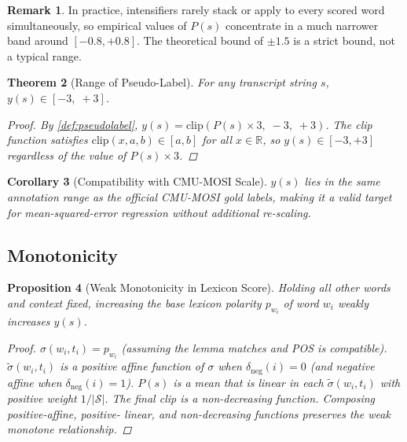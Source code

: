 \documentclass[12pt,a4paper]{article}
\theoremstyle{plain}
\newtheorem{theorem}{Theorem}[section]
\newtheorem{proposition}[theorem]{Proposition}
\newtheorem{corollary}[theorem]{Corollary}
\theoremstyle{definition}
\newtheorem{remark}[theorem]{Remark}
\begin{document}
\begin{remark}
  In practice, intensifiers rarely stack or apply to every scored
  word simultaneously, so empirical values of $P(s)$ concentrate
  in a much narrower band around $[-0.8, +0.8]$.  The theoretical
  bound of $\pm 1.5$ is a strict bound, not a typical range.
\end{remark}

\begin{theorem}[Range of Pseudo-Label]
\label{thm:label_range}
  For any transcript string $s$, $y(s) \in [-3,\; +3]$.
  \begin{proof}
    By \cref{def:pseudolabel},
    $y(s) = \text{clip}(P(s) \times 3,\; -3,\; +3)$.
    The clip function satisfies $\text{clip}(x, a, b) \in [a, b]$
    for all $x \in \mathbb{R}$, so $y(s) \in [-3, +3]$ regardless
    of the value of $P(s) \times 3$.
  \end{proof}
\end{theorem}

\begin{corollary}[Compatibility with CMU-MOSI Scale]
\label{cor:compat}
  $y(s)$ lies in the same annotation range as the official CMU-MOSI
  gold labels, making it a valid target for mean-squared-error
  regression without additional re-scaling.
\end{corollary}

\subsection{Monotonicity}

\begin{proposition}[Weak Monotonicity in Lexicon Score]
\label{prop:monotone}
  Holding all other words and context fixed, increasing the base
  lexicon polarity $p_{w_i}$ of word $w_i$ weakly increases $y(s)$.
  \begin{proof}
    $\sigma(w_i, t_i) = p_{w_i}$ (assuming the lemma matches and
    POS is compatible).  $\tilde{\sigma}(w_i,t_i)$ is a positive
    affine function of $\sigma$ when $\delta_{\text{neg}}(i) = 0$
    (and negative affine when $\delta_{\text{neg}}(i) = 1$).
    $P(s)$ is a mean that is linear in each $\tilde{\sigma}(w_i,t_i)$
    with positive weight $1/|\mathcal{S}|$.  The final clip is a
    non-decreasing function.  Composing positive-affine, positive-
    linear, and non-decreasing functions preserves the weak
    monotone relationship.
  \end{proof}
\end{proposition}
\end{document}
